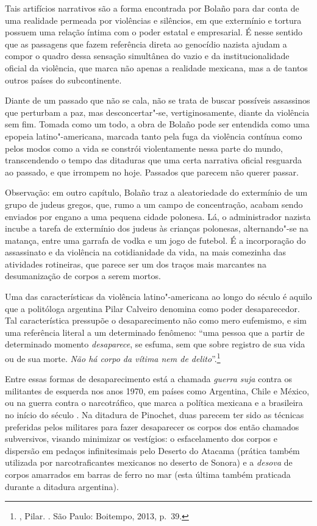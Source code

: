 Tais artifícios narrativos são a forma encontrada por Bolaño para dar
conta de uma realidade permeada por violências e silêncios, em que
extermínio e tortura possuem uma relação íntima com o poder estatal e
empresarial. É nesse sentido que as passagens que fazem referência
direta ao genocídio nazista ajudam a compor o quadro dessa sensação
simultânea do vazio e da institucionalidade oficial da violência, que
marca não apenas a realidade mexicana, mas a de tantos outros países do
subcontinente.

Diante de um passado que não se cala, não se trata de buscar possíveis
assassinos que perturbam a paz, mas desconcertar"-se, vertiginosamente,
diante da violência sem fim. Tomada como um todo, a obra de Bolaño pode
ser entendida como uma epopeia latino"-americana, marcada tanto pela
fuga da violência contínua como pelos modos como a vida se constrói
violentamente nessa parte do mundo, transcendendo o tempo das ditaduras
que uma certa narrativa oficial resguarda ao passado, e que irrompem no
hoje. Passados que parecem não querer passar.

Observação: em outro capítulo, Bolaño traz a aleatoriedade do extermínio
de um grupo de judeus gregos, que, rumo a um campo de concentração,
acabam sendo enviados por engano a uma pequena cidade polonesa. Lá, o
administrador nazista incube a tarefa de extermínio dos judeus às
crianças polonesas, alternando"-se na matança, entre uma garrafa de vodka
e um jogo de futebol. É a incorporação do assassinato e da violência na
cotidianidade da vida, na mais comezinha das atividades rotineiras, que
parece ser um dos traços mais marcantes na desumanização de corpos a
serem mortos.

\asterisc

Uma das características da violência latino"-americana ao longo do século
 é aquilo que a politóloga argentina Pilar Calveiro denomina como
poder desaparecedor. Tal característica pressupõe o desaparecimento não
como mero eufemismo, e sim uma referência literal a um determinado
fenômeno: ``uma pessoa que a partir de determinado momento
\emph{desaparece}, se esfuma, sem que sobre registro de sua vida ou de
sua morte. \emph{Não há corpo da vítima nem de delito}''.\footnote{,
  Pilar. {}. São Paulo: Boitempo, 2013, p.~39.}

Entre essas formas de desaparecimento está a chamada \emph{guerra suja} contra
os militantes de esquerda nos anos 1970, em países como Argentina, Chile
e México, ou na guerra contra o narcotráfico, que marca a política
mexicana e a brasileira no início do século . Na ditadura de
Pinochet, duas parecem ter sido as técnicas preferidas pelos militares
para fazer desaparecer os corpos dos então chamados subversivos, visando
minimizar os vestígios: o esfacelamento dos corpos e dispersão em
pedaços infinitesimais pelo Deserto do Atacama (prática também utilizada
por narcotraficantes mexicanos no deserto de Sonora) e a \emph{desova}
de corpos amarrados em barras de ferro no mar (esta última também
praticada durante a ditadura argentina).

